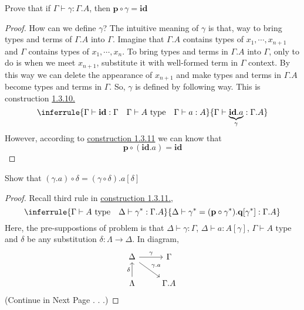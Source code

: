 \documentclass[12pt, a4paper, openany, twoside]{book}
\theoremstyle{definition}
\theoremstyle{remark}
\theoremstyle{plain}
\numberwithin{equation}{section}
\begin{document}
\begin{tcolorbox}[colback=yellow!10!white,colframe=brown!75!black,title=Exercise 2.1]\hypertarget{Exer 2.1.}{}

Prove that if $\Gamma \vdash \gamma : \Gamma.A$, then $\mathbf{p} \circ \gamma = \textbf{id}$
\begin{proof}
    How can we define $\gamma$? The intuitive meaning of $\gamma$ is that, way to bring types and terms 
    of $\Gamma.A$ into $\Gamma$. Imagine that $\Gamma.A$ contains types of $x_1, \cdots, x_{n+1}$ and 
    $\Gamma$ contains types of $x_1, \cdots, x_n$. To bring types and terms in $\Gamma.A$ into $\Gamma$, only to do is when we meet $x_{n+1}$, substitute it with well-formed term in $\Gamma$ context. 
    By this way we can delete the appearance of $x_{n+1}$ and make types and terms in $\Gamma.A$ become types and terms in $\Gamma$. 
    So, $\gamma$ is defined by following way. This is construction \hyperlink{subst extend}{1.3.10.}
    \[
    \inferrule
    {\Gamma \vdash \textbf{id} : \Gamma \quad \Gamma \vdash A \text{ type} \quad \Gamma \vdash a : A}
    {\Gamma \vdash \underbrace{\textbf{id}.a}_{\gamma} : \Gamma.A}
    \]
    However, according to \hyperlink{construction 1.3.11}{construction 1.3.11} we can know that 
    \[\mathbf{p} \circ (\mathbf{id}.a) = \mathbf{id}\]
\end{proof}
\end{tcolorbox}

\begin{tcolorbox}[colback=yellow!10!white,colframe=brown!75!black,title=Exercise 2.2]
Show that $(\gamma.a) \circ \delta = (\gamma \circ \delta).a[\delta]$

\begin{proof}
    Recall third rule in \hyperlink{construction 1.3.11}{construction 1.3.11.}, 
    \[
    \inferrule
    {\Gamma \vdash A \text{ type} \quad \Delta \vdash \gamma^* : \Gamma.A}
    {\Delta \vdash \gamma^* = (\mathbf{p}\circ \gamma^*).\mathbf{q}[\gamma^*] : \Gamma.A}
    \]
    Here, the pre-suppostions of problem is that $\Delta \vdash \gamma : \Gamma$, $\Delta \vdash a : A[\gamma]$, $\Gamma \vdash A \text{ type}$ and $\delta$ be any substitution $\delta : \Lambda \rightarrow \Delta$. 
    In diagram, 
    \[
    \begin{tikzcd}
        \Delta \arrow[r, "\gamma"] \arrow[rd, "\gamma.a"] & \Gamma \\
        \Lambda \arrow[u, "\delta"] & \Gamma.A
    \end{tikzcd}
    \]
    (Continue in Next Page . . .)
\end{proof}
\end{tcolorbox}
\end{document}
